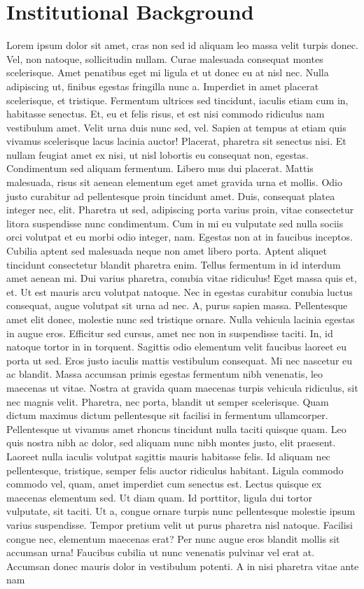 \documentclass[
  12pt,
]{article}
\begin{document}
\hypertarget{inst}{%
\section{Institutional Background}\label{inst}}

Lorem ipsum dolor sit amet, cras non sed id aliquam leo massa velit turpis donec. Vel, non natoque, sollicitudin nullam. Curae malesuada consequat montes scelerisque. Amet penatibus eget mi ligula et ut donec eu at nisl nec. Nulla adipiscing ut, finibus egestas fringilla nunc a. Imperdiet in amet placerat scelerisque, et tristique. Fermentum ultrices sed tincidunt, iaculis etiam cum in, habitasse senectus. Et, eu et felis risus, et est nisi commodo ridiculus nam vestibulum amet. Velit urna duis nunc sed, vel. Sapien at tempus at etiam quis vivamus scelerisque lacus lacinia auctor! Placerat, pharetra sit senectus nisi. Et nullam feugiat amet ex nisi, ut nisl lobortis eu consequat non, egestas. Condimentum sed aliquam fermentum. Libero mus dui placerat. Mattis malesuada, risus sit aenean elementum eget amet gravida urna et mollis. Odio justo curabitur ad pellentesque proin tincidunt amet. Duis, consequat platea integer nec, elit. Pharetra ut sed, adipiscing porta varius proin, vitae consectetur litora suspendisse nunc condimentum. Cum in mi eu vulputate sed nulla sociis orci volutpat et eu morbi odio integer, nam. Egestas non at in faucibus inceptos. Cubilia aptent sed malesuada neque non amet libero porta. Aptent aliquet tincidunt consectetur blandit pharetra enim. Tellus fermentum in id interdum amet aenean mi. Dui varius pharetra, conubia vitae ridiculus! Eget massa quis et, et. Ut est mauris arcu volutpat natoque. Nec in egestas curabitur conubia luctus consequat, augue volutpat sit urna ad nec. A, purus sapien massa. Pellentesque amet elit donec, molestie nunc sed tristique ornare. Nulla vehicula lacinia egestas in augue eros. Efficitur sed cursus, amet nec non in suspendisse taciti. In, id natoque tortor in in torquent. Sagittis odio elementum velit faucibus laoreet eu porta ut sed. Eros justo iaculis mattis vestibulum consequat. Mi nec nascetur eu ac blandit. Massa accumsan primis egestas fermentum nibh venenatis, leo maecenas ut vitae. Nostra at gravida quam maecenas turpis vehicula ridiculus, sit nec magnis velit. Pharetra, nec porta, blandit ut semper scelerisque. Quam dictum maximus dictum pellentesque sit facilisi in fermentum ullamcorper. Pellentesque ut vivamus amet rhoncus tincidunt nulla taciti quisque quam. Leo quis nostra nibh ac dolor, sed aliquam nunc nibh montes justo, elit praesent. Laoreet nulla iaculis volutpat sagittis mauris habitasse felis. Id aliquam nec pellentesque, tristique, semper felis auctor ridiculus habitant. Ligula commodo commodo vel, quam, amet imperdiet cum senectus est. Lectus quisque ex maecenas elementum sed. Ut diam quam. Id porttitor, ligula dui tortor vulputate, sit taciti. Ut a, congue ornare turpis nunc pellentesque molestie ipsum varius suspendisse. Tempor pretium velit ut purus pharetra nisl natoque. Facilisi congue nec, elementum maecenas erat? Per nunc augue eros blandit mollis sit accumsan urna! Faucibus cubilia ut nunc venenatis pulvinar vel erat at. Accumsan donec mauris dolor in vestibulum potenti. A in nisi pharetra vitae ante nam 
\end{document}
